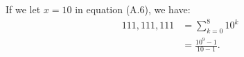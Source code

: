 If we let $x=10$ in equation (A.6), we have:
\begin{align*}
    111{,}111{,}111 &= \sum_{k=0}^8 10^k \\
    &= \frac{10^9-1}{10-1}.
\end{align*}
